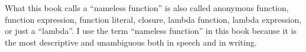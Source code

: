 What this book calls a ``nameless function'' is also called anonymous
function, function expression, function literal, closure, lambda function,
lambda expression, or just a ``lambda''. I use the term ``nameless
function'' in this book because it is the
most descriptive and unambiguous both in speech and in writing.
